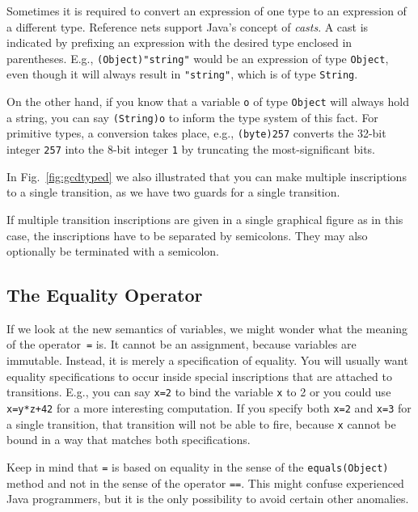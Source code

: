 Sometimes it is required to convert an expression of one type to an
expression of a different type. Reference nets support Java's
concept of \emph{casts}. A cast is indicated by prefixing
an expression with the desired type enclosed in parentheses.
E.g., \texttt{(Object)"string"} would be an expression
of type \texttt{Object}, even though it will always
result in \texttt{"string"}, which is of type \texttt{String}.

On the other hand, if you know that a variable \texttt{o} of type
\texttt{Object} will always hold a string, you can say
\texttt{(String)o} to inform the type system of this
fact. For primitive types, a conversion
takes place, e.g., \texttt{(byte)257} converts the 32-bit
integer \texttt{257} into the 8-bit integer \texttt{1} by
truncating the most-significant bits.

In Fig.~\ref{fig:gcdtyped} we also illustrated that you can
make multiple inscriptions to a single transition, as we have
two guards for a single transition.

If multiple transition inscriptions are
given in a single graphical figure as in this case,
the inscriptions have to be separated by semicolons.
They may also optionally be terminated with a semicolon.


\subsection{The Equality Operator}
\label{subsec:equality}

If we look at the new semantics of variables, we might wonder
what the meaning of the operator~\texttt{=} is.
It cannot be an assignment, because variables are immutable.
Instead, it is merely a specification of equality. You will usually
want equality specifications to occur inside special inscriptions
that are attached to transitions. E.g., you can say
\texttt{x=2} to bind the variable \texttt{x} to 2 or you could
use \texttt{x=y*z+42} for a more interesting computation.
If you specify both \texttt{x=2} and \texttt{x=3} for a single
transition, that transition will not be able to fire, because
\texttt{x} cannot be bound in a way that matches both specifications.

Keep in mind that \texttt{=} is based on equality in the
sense of the \texttt{equals(Object)} method and not in the sense of
the operator \texttt{==}. This might confuse experienced Java
programmers, but it is the only possibility to avoid certain other
anomalies.


